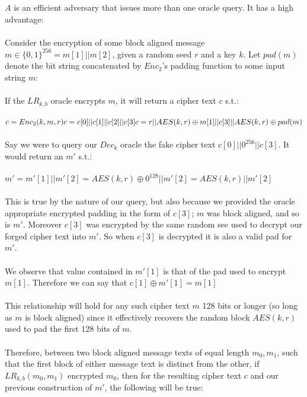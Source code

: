 \documentclass[]{article}
\begin{document}
\begin{enumerate}[label=(\alph*)]
	$A$ is an efficient adversary that issues more than one oracle query. It has a high advantage:
	\\\\
	Consider the encryption of some block aligned message $m \in \{0,1\}^{256} = m[1] || m[2]$, given a random seed $r$ and a key $k$. Let $pad(m)$ denote the bit string concatenated by $Enc_2$'s padding function to some input string $m$:
	\\\\
	If the $LR_{k,b}$ oracle encrypts $m$, it will return a cipher text $c$ s.t.:
	\\\\
	$c = Enc_2(k, m, r) \\
	c = c[0] || c[1] || c[2] || c[3] \\
	c = r || AES(k, r) \oplus m[1] || c[3] || AES(k, r) \oplus pad(m)$
	\\\\
	Say we were to query our $Dec_k$ oracle the fake cipher text $c[0] || {0}^{256} || c[3]$. It would return an $m'$ s.t.:
	\\\\
	$m' = m'[1] || m'[2] = AES(k, r) \oplus {0}^{128}|| m'[2] = AES(k, r) || m'[2]$
	\\\\
	This is true by the nature of our query, but also because we provided the oracle appropriate encrypted padding in the form of $c[3]$; $m$ was block aligned, and so is $m'$. Moreover $c[3]$ was encrypted by the same random see used to decrypt our forged cipher text into $m'$. So when $c[3]$ is decrypted it is also a valid pad for $m'$. 
	\\\\
	We observe that value contained in $m'[1]$ is that of the pad used to encrypt $m[1]$. Therefore we can say that $c[1] \oplus m'[1] = m[1]$
	\\\\
	This relationship will hold for any such cipher text $m$ 128 bits or longer (so long as $m$ is block aligned) since it effectively recovers the random block $AES(k, r)$ used to pad the first 128 bits of $m$. 
	\\\\
	Therefore, between two block aligned message texts of equal length $m_0, m_1$, such that the first block of either message text is distinct from the other, if  $LR_{k,b}(m_0, m_1)$ encrypted $m_0$, then for the resulting cipher text $c$ and our previous construction of $m'$, the following will be true:
	\\\\

\end{enumerate}
\end{document}
